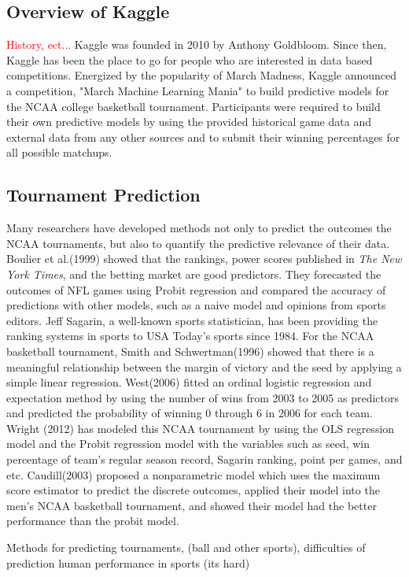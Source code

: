 \subsection{Overview of Kaggle}
\textcolor{red}{History, ect...}    
Kaggle was founded in 2010 by Anthony Goldbloom. Since then, Kaggle has been the place to go for people who are interested in data based competitions. Energized by the popularity of March Madness, Kaggle announced a competition, "March Machine Learning Mania" to build predictive models for the NCAA college basketball tournament. Participants were required to build their own predictive models by using the provided historical game data and external data from any other sources and to submit their winning percentages for all possible matchups.

\subsection{Tournament Prediction}
Many researchers have developed methods not only to predict the outcomes the NCAA tournaments, but also to quantify the predictive relevance of their data. Boulier et al.(1999) showed that the rankings, power scores published in \emph{The New York Times}, and the betting market are good predictors. They forecasted the outcomes of NFL games using Probit regression and compared the accuracy of predictions with other models, such as a naive model and opinions from sports editors. Jeff Sagarin, a well-known sports statistician, has been providing the ranking systems in sports to USA Today's sports since 1984. For the NCAA basketball tournament, Smith and Schwertman(1996) showed that there is a meaningful relationship between the margin of victory and the seed by applying a simple linear regression. West(2006) fitted an ordinal logistic regression and expectation method by using the number of wins from 2003 to 2005 as predictors and predicted the probability of winning 0 through 6 in 2006 for each team. Wright (2012) has modeled this NCAA tournament by using the OLS regression model and the Probit regression model with the variables such as seed, win percentage of team's regular season record, Sagarin ranking, point per games, and etc. Caudill(2003) proposed a nonparametric model which uses the maximum score estimator to predict the discrete outcomes, applied their model into the men's NCAA basketball tournament, and showed their model had the better performance than the probit model.
 

Methods for predicting tournaments, (ball and other sports), difficulties of prediction human performance in sports (its hard)
